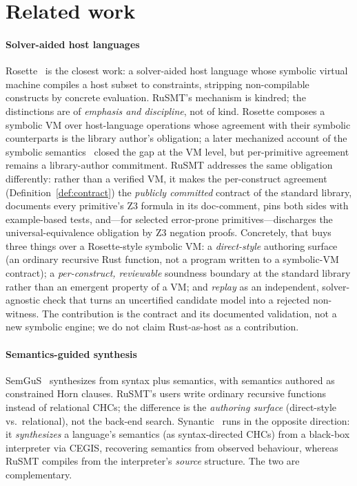 \documentclass[sigplan,review,anonymous]{acmart}
\theoremstyle{definition}
\theoremstyle{remark}
\newcommand{\rusmt}{RuSMT}
\begin{document}
\section{Related work}
\label{sec:related}

\paragraph{Solver-aided host languages}
Rosette~\cite{torlak2013rosette,torlak2014rosette} is the closest work: a
solver-aided host language whose symbolic virtual machine compiles a host subset
to constraints, stripping non-compilable constructs by concrete evaluation.
\rusmt{}'s mechanism is kindred; the distinctions are of \emph{emphasis and
discipline}, not of kind. Rosette composes a symbolic VM over host-language
operations whose agreement with their symbolic counterparts is the library
author's obligation; a later mechanized account of the symbolic
semantics~\cite{porncharoenwase2022leanette} closed the gap at the VM level, but
per-primitive agreement remains a library-author commitment. \rusmt{} addresses
the same obligation differently: rather than a verified VM, it makes the
per-construct agreement (Definition~\ref{def:contract}) the \emph{publicly
committed} contract of the standard library, documents every primitive's Z3
formula in its doc-comment, pins both sides with example-based tests,
and---for selected error-prone primitives---discharges the universal-equivalence
obligation by Z3 negation proofs. Concretely, that buys three things over a
Rosette-style symbolic VM: a \emph{direct-style} authoring surface (an ordinary
recursive Rust function, not a program written to a symbolic-VM contract); a
\emph{per-construct, reviewable} soundness boundary at the standard library rather
than an emergent property of a VM; and \emph{replay} as an independent,
solver-agnostic check that turns an uncertified candidate model into a rejected
non-witness. The contribution is the contract and its documented validation, not a
new symbolic engine; we do not claim Rust-as-host as a contribution.

\paragraph{Semantics-guided synthesis}
SemGuS~\cite{kim2021semgus} synthesizes from syntax plus semantics, with semantics
authored as constrained Horn clauses. \rusmt{}'s users write ordinary recursive
functions instead of relational CHCs; the difference is the \emph{authoring
surface} (direct-style vs.\ relational), not the back-end search.
Synantic~\cite{liu2024synantic} runs in the opposite direction: it
\emph{synthesizes} a language's semantics (as syntax-directed CHCs) from a
black-box interpreter via CEGIS, recovering semantics from observed behaviour,
whereas \rusmt{} compiles from the interpreter's \emph{source} structure. The two
are complementary.
\end{document}

